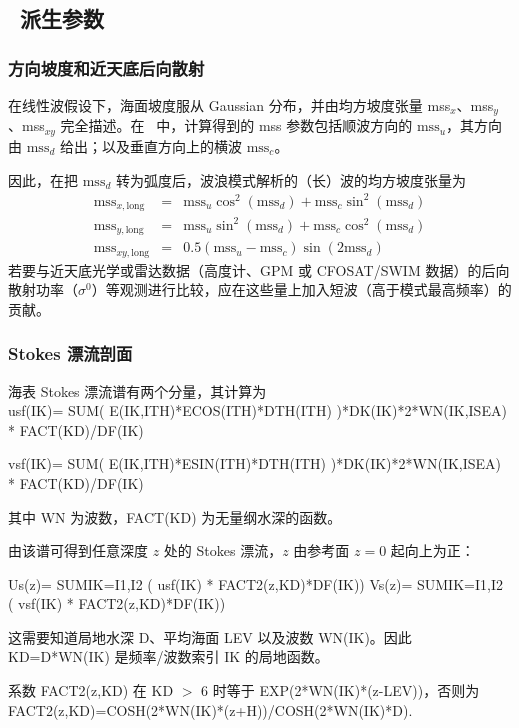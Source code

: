 \vssub
\subsection{~派生参数} \label{sub:outpars}
\vssub

\subsubsection{方向坡度和近天底后向散射}
在线性波假设下，海面坡度服从 Gaussian 分布，并由均方坡度张量 mss$_x$、mss$_y$、mss$_{xy}$ 完全描述。在 \ws\ 中，计算得到的 mss 参数包括顺波方向的 $\mathrm{mss}_u$，其方向由 $\mathrm{mss}_d$ 给出；以及垂直方向上的横波 $\mathrm{mss}_c$。

因此，在把 $\mathrm{mss}_d$ 转为弧度后，波浪模式解析的（长）波的均方坡度张量为
\begin{eqnarray}
   \mathrm{mss}_{x,\mathrm{long}} &=& \mathrm{mss}_u \cos^2(\mathrm{mss}_d)+\mathrm{mss}_c \sin^2(\mathrm{mss}_d) \\
   \mathrm{mss}_{y,\mathrm{long}} &=& \mathrm{mss}_u \sin^2(\mathrm{mss}_d)+\mathrm{mss}_c \cos^2(\mathrm{mss}_d) \\
   \mathrm{mss}_{xy,\mathrm{long}}&=&0.5 (\mathrm{mss}_u - \mathrm{mss}_c) \sin(2 \mathrm{mss}_d)
\end{eqnarray}
若要与近天底光学或雷达数据（高度计、GPM 或 CFOSAT/SWIM 数据）的后向散射功率（$\sigma^0$）等观测进行比较，应在这些量上加入短波（高于模式最高频率）的贡献。
   
\subsubsection{Stokes 漂流剖面}
海表 Stokes 漂流谱有两个分量，其计算为 \\
{\code usf(IK)= SUM( E(IK,ITH)*ECOS(ITH)*DTH(ITH) )*DK(IK)*2*WN(IK,ISEA) *  FACT(KD)/DF(IK)}

{\code vsf(IK)= SUM( E(IK,ITH)*ESIN(ITH)*DTH(ITH) )*DK(IK)*2*WN(IK,ISEA) *  FACT(KD)/DF(IK)}

其中 WN 为波数，FACT(KD) 为无量纲水深的函数。

由该谱可得到任意深度 $z$ 处的 Stokes 漂流，$z$ 由参考面 $z=0$ 起向上为正：

Us(z)= SUM{IK=I1,I2} ( usf(IK) * FACT2(z,KD)*DF(IK))
Vs(z)= SUM{IK=I1,I2} ( vsf(IK) * FACT2(z,KD)*DF(IK))

这需要知道局地水深 D、平均海面 LEV 以及波数 WN(IK)。因此 KD=D*WN(IK) 是频率/波数索引 IK 的局地函数。

系数 FACT2(z,KD) 在 KD $>$ 6 时等于 EXP(2*WN(IK)*(z-LEV))，否则为\\
FACT2(z,KD)=COSH(2*WN(IK)*(z+H))/COSH(2*WN(IK)*D).
